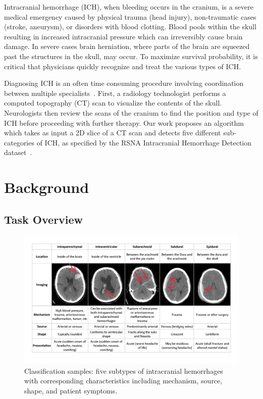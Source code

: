 \documentclass[runningheads]{llncs}
\begin{document}
Intracranial hemorrhage (ICH), when bleeding occurs in the cranium, is a severe medical emergency caused by physical trauma (head injury), non-traumatic cases (stroke, aneurysm), or disorders with blood clotting.
Blood pools within the skull resulting in increased intracranial pressure which can irreversibly cause brain damage.
In severe cases brain herniation, where parts of the brain are squeezed past the structures in the skull, may occur.
To maximize survival probability, it is critical that physicians quickly recognize and treat the various types of ICH.

Diagnosing ICH is an often time consuming procedure involving coordination between multiple specialists~\cite{PMID:9537967}.
First, a radiology technologist performs a computed topography (CT) scan to visualize the contents of the skull.
Neurologists then review the scans of the cranium to find the position and type of ICH before proceeding with further therapy.
Our work proposes an algorithm which takes as input a 2D slice of a CT scan and detects five different sub-categories of ICH, as specified by the RSNA Intracranial Hemorrhage Detection dataset~\cite{kaggle/rsna-ich}.

\section{Background}

\subsection{Task Overview}

\begin{figure}[htbp]
    \centering
    \includegraphics[width=4.8in]{fig/subtypes-of-hemorrhage}
    \caption{Classification samples: five subtypes of intracranial hemorrhages with corresponding characteristics including mechanism, source, shape, and patient symptoms.}
    \label{fig:ich-subtypes}
\end{figure}
\end{document}
